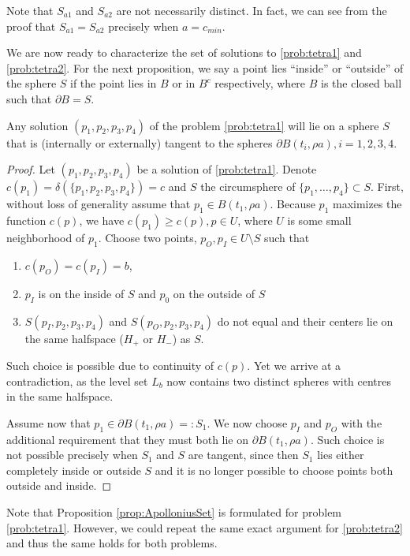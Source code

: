 Note that $S_{a1}$ and $S_{a2}$ are not necessarily distinct. In fact, we can see from the proof that $S_{a1}=S_{a2}$ precisely when $a=c_{min}$.


We are now ready to characterize the set of solutions to \ref{prob:tetra1} and \ref{prob:tetra2}. For the next proposition, we say a point lies ``inside'' or ``outside'' of the sphere $S$ if the point lies in $B$ or in $B^c$ respectively, where $B$ is the closed ball such that $\partial B = S$.


\begin{proposition}\label{prop:ApolloniusSet}
Any solution $(p_1,p_2,p_3,p_4)$ of the problem \ref{prob:tetra1} will lie on a sphere $S$ that is (internally or externally) tangent to the spheres $\partial B(t_i,\rho a), i =1,2,3,4$. 
\end{proposition}
\begin{proof}
	Let $(p_1,p_2,p_3,p_4)$ be a solution of \ref{prob:tetra1}. Denote $c(p_1)=\delta(\{p_1,p_2,p_3,p_4\})=c$ and $S$ the circumsphere of $\{p_1,\dots,p_4\}\subset S$. 
	First, without loss of generality assume that $p_1 \in B(t_1,\rho a)$. Because $p_1$ maximizes the function $c(p)$, we have $c(p_1)\geq c(p), p\in U$, where $U$ is some small neighborhood of $p_1$. Choose two points, $p_O,p_I\in U\setminus S$ such that 
\begin{enumerate} 
\item $c(p_O)=c(p_I)=b$,
\item $p_I$ is on the inside of $S$ and $p_0$ on the outside of $S$ 
\item {}$S(p_I,p_2,p_3,p_4)$ and $S(p_O,p_2,p_3,p_4)$ do not equal and their centers lie on the same halfspace ($H_+$ or $H_-$) as $S$. 
\end{enumerate}
Such choice is possible due to continuity of $c(p)$. Yet we arrive at a contradiction, as the level set $L_b$ now contains two distinct spheres with centres in the same halfspace. 

Assume now that $p_1 \in \partial B(t_1,\rho a)=: S_1$. We now choose $p_I$ and $p_O$ with the additional requirement that they must both lie on $\partial B(t_1,\rho a)$. Such choice is not possible precisely when $S_1$ and $S$ are tangent, since then  $S_1$ lies either completely inside or outside $S$ and it is no longer possible to choose points both outside and inside. 
\end{proof}
Note that Proposition \ref{prop:ApolloniusSet} is formulated for problem \ref{prob:tetra1}. However, we could repeat the same exact argument for \ref{prob:tetra2} and thus the same holds for both problems.\newline


